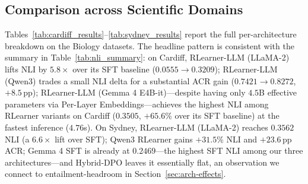 \subsection{Comparison across Scientific Domains}
Tables~\ref{tab:cardiff_results}--\ref{tab:sydney_results} report the full per-architecture breakdown on the Biology datasets. The headline pattern is consistent with the summary in Table~\ref{tab:nli_summary}: on Cardiff, RLearner-LLM (LLaMA-2) lifts NLI by $5.8\times$ over its SFT baseline ($0.0555 \to 0.3209$); RLearner-LLM (Qwen3) trades a small NLI delta for a substantial ACR gain ($0.7421 \to 0.8272$, $+8.5$\,pp); RLearner-LLM (Gemma 4 E4B-it)---despite having only $4.5$B effective parameters via Per-Layer Embeddings---achieves the highest NLI among RLearner variants on Cardiff ($0.3505$, $+65.6\%$ over its SFT baseline) at the fastest inference ($4.76$s). On Sydney, RLearner-LLM (LLaMA-2) reaches $0.3562$ NLI (a $6.6\times$ lift over SFT); Qwen3 RLearner gains $+31.5\%$ NLI and $+23.6$\,pp ACR; Gemma 4 SFT is already at $0.2469$---the highest SFT NLI among our three architectures---and Hybrid-DPO leaves it essentially flat, an observation we connect to entailment-headroom in Section~\ref{sec:arch-effects}.

